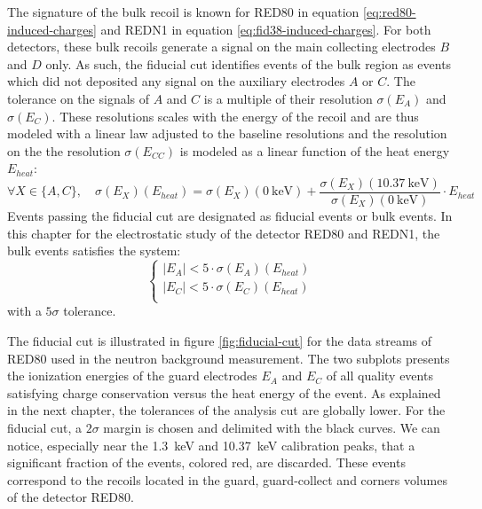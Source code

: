 The signature of the bulk recoil is known for RED80 in equation \ref{eq:red80-induced-charges} and REDN1 in equation \ref{eq:fid38-induced-charges}. For both detectors, these bulk recoils generate a signal on the main collecting electrodes $B$ and $D$ only. As such, the fiducial cut identifies events of the bulk region as events which did not deposited any signal on the auxiliary electrodes $A$ or $C$. The tolerance on the signals of $A$ and $C$ is a multiple of their resolution $\sigma(E_A)$ and $\sigma(E_C)$. These resolutions scales with the energy of the recoil and are thus modeled with a linear law adjusted to the baseline resolutions and the resolution on the 
the resolution $\sigma(E_{CC})$ is modeled as a linear function of the heat energy $E_{heat}$:
\begin{equation}
\forall X \in \{A, C \}, \quad 
\sigma(E_{X})(E_{heat})
=
\sigma(E_{X})(\SI{0}{\kilo\eV}) + \frac{\sigma(E_{X})(\SI{10.37}{\kilo\eV})}{\sigma(E_{X})(\SI{0}{\kilo\eV})} \cdot E_{heat}
\end{equation}
Events passing the fiducial cut are designated as fiducial events or bulk events. In this chapter for the electrostatic study of the detector RED80 and REDN1, the bulk events satisfies the system:
\begin{equation}
\begin{cases}
|E_A| < 5 \cdot \sigma(E_A)(E_{heat}) \\
|E_C| < 5 \cdot \sigma(E_C)(E_{heat}) \\
\end{cases}
\end{equation}
with a $5\sigma$ tolerance.

The fiducial cut is illustrated in figure \ref{fig:fiducial-cut} for the data streams of RED80 used in the neutron background measurement. The two subplots presents the ionization energies of the guard electrodes $E_A$ and $E_C$ of all quality events satisfying charge conservation versus the heat energy of the event. As explained in the next chapter, the tolerances of the analysis cut are globally lower. For the fiducial cut, a $2\sigma$ margin is chosen and delimited with the black curves. We can notice, especially near the \SI{1.3}{\kilo\eV} and \SI{10.37}{\kilo\eV} calibration peaks, that a significant fraction of the events, colored red, are discarded. These events correspond to the recoils located in the guard, guard-collect and corners volumes of the detector RED80.

